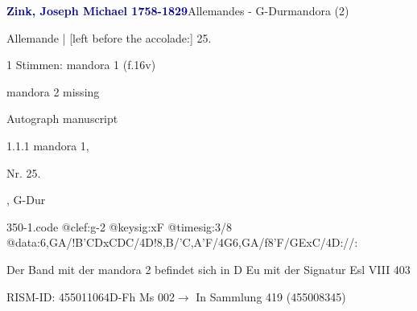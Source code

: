 \documentclass[twocolumn, 12pt]{book}
\begin{document}
\par \vspace{16pt} \textcolor{darkblue}{\textbf{Zink, Joseph Michael  1758-1829}}\hfillplus{\textbf{[350]}}\newline Allemandes - G-Dur\newline mandora (2)
\par \begin{itshape}[f.16v, at left:] Allemande | [left before the accolade:] 25.\end{itshape} 
\par \textcolor{darkblue}{}  1 Stimmen: mandora 1  (f.16v)\newline \begin{small} mandora 2 missing\end{small} \newline Autograph manuscript
\par 1.1.1  mandora 1, \begin{itshape}Nr. 25.\end{itshape}, G-Dur  
\begin{filecontents*}{350-1.code}
@clef:g-2
@keysig:xF
@timesig:3/8
@data:{6,GA}/!{B'CD}{xCDC}/4D!8,B/'C,A'F/4G{6,GA}/f8'F/GExC/4D://:
\end{filecontents*}
\newline %
\par Der Band mit der mandora 2 befindet sich in D Eu mit der Signatur Esl VIII 403
\par RISM-ID: 455011064\newline D-Fh  Ms 002\newline $\rightarrow$ In Sammlung 419 (455008345)
      
\end{document}
